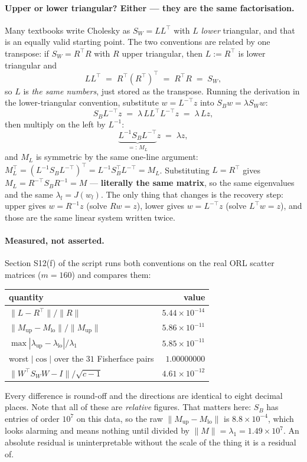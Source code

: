 \documentclass[11pt]{article}
\theoremstyle{definition}
\theoremstyle{remark}
\newcommand{\Sw}{S_W}
\newcommand{\Sb}{S_B}
\begin{document}
\paragraph{Upper or lower triangular? Either --- they are the same factorisation.}
Many textbooks write Cholesky as $\Sw = LL^{\!\top}$ with $L$ \emph{lower}
triangular, and that is an equally valid starting point. The two conventions are
related by one transpose: if $\Sw = R^{\!\top}R$ with $R$ upper triangular, then
$L := R^{\!\top}$ is lower triangular and
\[
  LL^{\!\top} \;=\; R^{\!\top}\!\left(R^{\!\top}\right)^{\!\top} \;=\; R^{\!\top}R \;=\; \Sw ,
\]
so $L$ is \emph{the same numbers}, just stored as the transpose. Running the
derivation in the lower-triangular convention, substitute $w = L^{-\top}z$ into
$\Sb w = \lambda \Sw w$:
\[
  \Sb L^{-\top} z \;=\; \lambda\, LL^{\!\top}L^{-\top} z \;=\; \lambda\, L z ,
\]
then multiply on the left by $L^{-1}$:
\[
  \underbrace{L^{-1}\Sb L^{-\top}}_{=:\,M_L} z \;=\; \lambda z ,
\]
and $M_L$ is symmetric by the same one-line argument:
$M_L^{\!\top} = (L^{-1}\Sb L^{-\top})^{\!\top} = L^{-1}\Sb^{\!\top}L^{-\top} = M_L$.
Substituting $L = R^{\!\top}$ gives
$M_L = R^{-\top}\Sb R^{-1} = M$ --- \textbf{literally the same matrix}, so the
same eigenvalues and the same $\lambda_l = J(w_l)$. The only thing that changes
is the recovery step: upper gives $w = R^{-1}z$ (solve $Rw=z$), lower gives
$w = L^{-\top}z$ (solve $L^{\!\top}w = z$), and those are the same linear system
written twice.

\paragraph{Measured, not asserted.} Section S12(f) of the script runs both
conventions on the real ORL scatter matrices ($m=160$) and compares them:
\begin{center}
\begin{tabular}{lr}
\toprule
quantity & value \\
\midrule
$\|L - R^{\!\top}\| / \|R\|$                                   & $5.44\times10^{-14}$ \\
$\|M_{\mathrm{up}} - M_{\mathrm{lo}}\| / \|M_{\mathrm{up}}\|$  & $5.86\times10^{-11}$ \\
$\max|\lambda_{\mathrm{up}} - \lambda_{\mathrm{lo}}| / \lambda_1$ & $5.85\times10^{-11}$ \\
worst $|\cos|$ over the $31$ Fisherface pairs                  & $1.00000000$ \\
$\|W^{\!\top}\Sw W - I\| / \sqrt{c-1}$                         & $4.61\times10^{-12}$ \\
\bottomrule
\end{tabular}
\end{center}
Every difference is round-off and the directions are identical to eight decimal
places. Note that all of these are \emph{relative} figures. That matters here:
$\Sb$ has entries of order $10^{7}$ on this data, so the raw
$\|M_{\mathrm{up}} - M_{\mathrm{lo}}\|$ is $8.8\times10^{-4}$, which looks
alarming and means nothing until divided by $\|M\| = \lambda_1 = 1.49\times10^{7}$.
An absolute residual is uninterpretable without the scale of the thing it is a
residual of.
\end{document}
